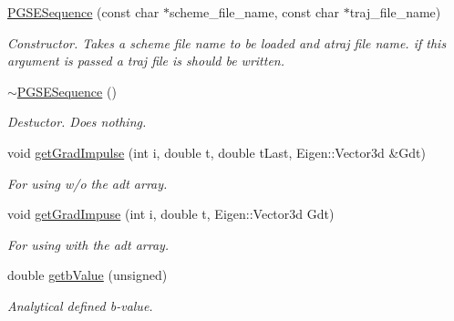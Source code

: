 \begin{DoxyCompactItemize}
\mbox{\label{class_p_g_s_e_sequence_a1eb4e53eb0769b16eb9bb2156c769644}} 
\hyperlink{class_p_g_s_e_sequence_a1eb4e53eb0769b16eb9bb2156c769644}{P\+G\+S\+E\+Sequence} (const char $\ast$scheme\+\_\+file\+\_\+name, const char $\ast$traj\+\_\+file\+\_\+name)
\begin{DoxyCompactList}\small\item\em Constructor. Takes a scheme file name to be loaded and atraj file name. if this argument is passed a traj file is should be written. \end{DoxyCompactList}\item 
\mbox{\label{class_p_g_s_e_sequence_a7e5815e4ae0b3a6d42c45322fc69fdd6}} 
\hyperlink{class_p_g_s_e_sequence_a7e5815e4ae0b3a6d42c45322fc69fdd6}{$\sim$\+P\+G\+S\+E\+Sequence} ()
\begin{DoxyCompactList}\small\item\em Destuctor. Does nothing. \end{DoxyCompactList}\item 
\mbox{\label{class_p_g_s_e_sequence_a3f2a705b7d3312944630f3d7f639e8e4}} 
void \hyperlink{class_p_g_s_e_sequence_a3f2a705b7d3312944630f3d7f639e8e4}{get\+Grad\+Impulse} (int i, double t, double t\+Last, Eigen\+::\+Vector3d \&Gdt)
\begin{DoxyCompactList}\small\item\em For using w/o the adt array. \end{DoxyCompactList}\item 
\mbox{\label{class_p_g_s_e_sequence_a9985ead781333f782d1dee54482eb0d2}} 
void \hyperlink{class_p_g_s_e_sequence_a9985ead781333f782d1dee54482eb0d2}{get\+Grad\+Impuse} (int i, double t, Eigen\+::\+Vector3d Gdt)
\begin{DoxyCompactList}\small\item\em For using with the adt array. \end{DoxyCompactList}\item 
\mbox{\label{class_p_g_s_e_sequence_a8b0671a505f79a601d3d4d2d9b7f36cc}} 
double \hyperlink{class_p_g_s_e_sequence_a8b0671a505f79a601d3d4d2d9b7f36cc}{getb\+Value} (unsigned)
\begin{DoxyCompactList}\small\item\em Analytical defined b-\/value. \end{DoxyCompactList}\item 

\end{DoxyCompactItemize}
